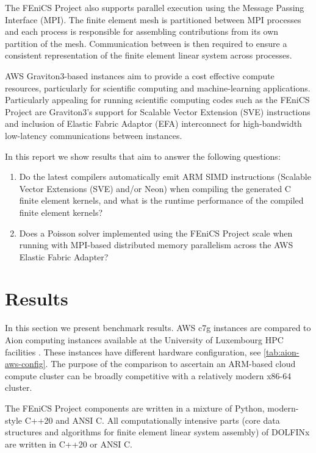The FEniCS Project also supports parallel execution using the Message Passing
Interface (MPI). The finite element mesh is partitioned between MPI processes
and each process is responsible for assembling contributions from its own
partition of the mesh. Communication between is then required to ensure a
consistent representation of the finite element linear system across processes.

AWS Graviton3-based instances aim to provide a cost effective compute
resources, particularly for scientific computing and machine-learning
applications. Particularly appealing for running scientific computing codes
such as the FEniCS Project are Graviton3's support for Scalable Vector
Extension (SVE) instructions and inclusion of Elastic Fabric Adaptor (EFA)
interconnect for high-bandwidth low-latency communications between instances.

In this report we show results that aim to answer the following questions:
\begin{enumerate}
\item Do the latest compilers automatically emit ARM SIMD instructions
      (Scalable Vector Extensions (SVE) and/or Neon) when compiling the
      generated C finite element kernels, and what is the runtime
      performance of the compiled finite element kernels?
\item Does a Poisson solver implemented using the FEniCS Project scale when
      running with MPI-based distributed memory parallelism across the AWS
      Elastic Fabric Adapter?
\end{enumerate}

\section*{Results}
In this section we present benchmark results. AWS c7g instances are compared to
Aion computing instances available at the University of Luxembourg HPC
facilities \cite{VCPKVO_HPCCT22}. These instances have different hardware
configuration, see \autoref{tab:aion-aws-config}. The purpose of the comparison
to ascertain an ARM-based cloud compute cluster can be broadly competitive with
a relatively modern x86-64 cluster.

The FEniCS Project components are written in a mixture of Python, modern-style
C++20 and ANSI C. All computationally intensive parts (core data structures and
algorithms for finite element linear system assembly) of DOLFINx are written in
C++20 or ANSI C.

